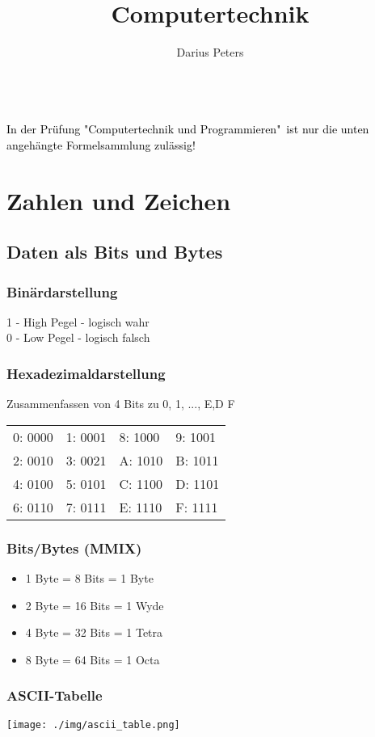\documentclass[german, threecolumn, 8pt]{latex4ei/latex4ei_sheet}
\title{Computertechnik}
\author{Darius Peters}                    %
\begin{document}
\ifdefined\GitRevision{}\fi
\ifdefined\GitIssuesURL
  \ifdefined\setissueslinkurl
    \setissueslinkurl{\GitIssuesURL} %
  \fi
\fi

\maketitle   %
\\
\textcolor{black}{\small In der Prüfung "Computertechnik und Programmieren"\ ist nur die unten angehängte Formelsammlung zulässig!}
\section{Zahlen und Zeichen}
    \subsection{Daten als Bits und Bytes}
	\subsubsection{Binärdarstellung}
	1 - High Pegel - logisch wahr\\
	0 - Low Pegel - logisch falsch
	\subsubsection{Hexadezimaldarstellung}
	Zusammenfassen von 4 Bits zu 0, 1, ..., E,D F\\
	\begin{tabular}{l|l||l|l}
	0: 0000 & 1: 0001 & 8: 1000 & 9: 1001\\
	2: 0010 & 3: 0021 & A: 1010 & B: 1011\\
	4: 0100 & 5: 0101 & C: 1100 & D: 1101\\
	6: 0110 & 7: 0111 & E: 1110 & F: 1111\\
	\end{tabular}
	\subsubsection{Bits/Bytes (MMIX)}
	\begin{itemize}\itemsep0pt
	\item1 Byte = 8 Bits = 1 Byte
	\item2 Byte = 16 Bits = 1 Wyde
	\item4 Byte = 32 Bits = 1 Tetra
	\item8 Byte = 64 Bits = 1 Octa
	\end{itemize}
	\begin{sectionbox}
	\subsubsection{ASCII-Tabelle}
	\texttt{[image: ./img/ascii\_table.png]}
	\end{sectionbox}
\end{document}
